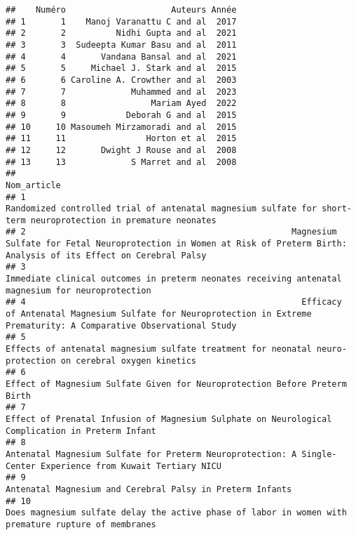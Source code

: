 \documentclass[
]{article}
\begin{document}
\begin{verbatim}
##    Numéro                     Auteurs Année
## 1       1    Manoj Varanattu C and al  2017
## 2       2          Nidhi Gupta and al  2021
## 3       3  Sudeepta Kumar Basu and al  2011
## 4       4       Vandana Bansal and al  2021
## 5       5     Michael J. Stark and al  2015
## 6       6 Caroline A. Crowther and al  2003
## 7       7             Muhammed and al  2023
## 8       8                 Mariam Ayed  2022
## 9       9            Deborah G and al  2015
## 10     10 Masoumeh Mirzamoradi and al  2015
## 11     11                Horton et al  2015
## 12     12       Dwight J Rouse and al  2008
## 13     13             S Marret and al  2008
##                                                                                                                                                                   Nom_article
## 1                                                             Randomized controlled trial of antenatal magnesium sulfate for short-term neuroprotection in premature neonates
## 2                                                     Magnesium Sulfate for Fetal Neuroprotection in Women at Risk of Preterm Birth: Analysis of its Effect on Cerebral Palsy
## 3                                                                           Immediate clinical outcomes in preterm neonates receiving antenatal magnesium for neuroprotection
## 4                                                       Efficacy of Antenatal Magnesium Sulfate for Neuroprotection in Extreme Prematurity: A Comparative Observational Study
## 5                                                                  Effects of antenatal magnesium sulfate treatment for neonatal neuro-protection on cerebral oxygen kinetics
## 6                                                                                                  Effect of Magnesium Sulfate Given for Neuroprotection Before Preterm Birth
## 7                                                                            Effect of Prenatal Infusion of Magnesium Sulphate on Neurological Complication in Preterm Infant
## 8                                                               Antenatal Magnesium Sulfate for Preterm Neuroprotection: A Single-Center Experience from Kuwait Tertiary NICU
## 9                                                                                                                   Antenatal Magnesium and Cerebral Palsy in Preterm Infants
## 10                                                                       Does magnesium sulfate delay the active phase of labor in women with premature rupture of membranes 

\end{verbatim}
\end{document}
